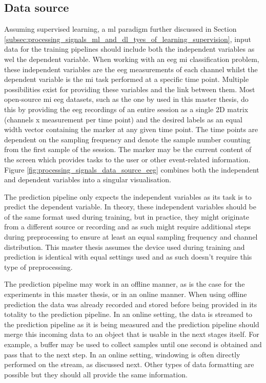 
\subsection{Data source}
\label{subsec:processing_signals_general_pipeline_data_acquisition}

Assuming supervised learning, a \gls{ml} paradigm further discussed in Section \ref{subsec:processing_signals_ml_and_dl_tyes_of_learning_supervision}, input data for the training pipelines should include both the independent variables as wel the dependent variable.
When working with an \gls{eeg} \gls{mi} classification problem, these independent variables are the \gls{eeg} measurements of each channel whilst the dependent variable is the \gls{mi} task performed at a specific time point.
Multiple possibilities exist for providing these variables and the link between them.
Most open-source \gls{mi} \gls{eeg} datasets, such as the one by \citet{eeg_data} used in this master thesis, do this by providing the \gls{eeg} recordings of an entire session as a single 2D matrix (channels x measurement per time point) and the desired labels as an equal width vector containing the marker at any given time point.
The time points are dependent on the sampling frequency and denote the sample number counting from the first sample of the session.
The marker may be the current content of the screen which provides tasks to the user or other event-related information.
Figure \ref{fig:processing_signals_data_source_eeg} combines both the independent and dependent variables into a singular visualisation.

The prediction pipeline only expects the independent variables as its task is to predict the dependent variable.
In theory, these independent variables should be of the same format used during training, but in practice, they might originate from a different source or recording and as such might require additional steps during preprocessing to ensure at least an equal sampling frequency and channel distribution.
This master thesis assumes the device used during training and prediction is identical with equal settings used and as such doesn't require this type of preprocessing.

The prediction pipeline may work in an offline manner, as is the case for the experiments in this master thesis, or in an online manner.
When using offline prediction the data was already recorded and stored before being provided in its totality to the prediction pipeline.
In an online setting, the data is streamed to the prediction pipeline as it is being measured and the prediction pipeline should merge this incoming data to an object that is usable in the next stages itself.
For example, a buffer may be used to collect samples until one second is obtained and pass that to the next step.
In an online setting, windowing is often directly performed on the stream, as discussed next.
Other types of data formatting are possible but they should all provide the same information.


